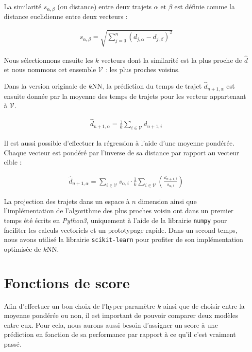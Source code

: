 \documentclass[letterpaper]{article}
\begin{document}
La similarité $s_{\alpha,\beta}$ (ou distance) entre deux trajets $\alpha$ et $\beta$ est définie comme la distance euclidienne entre deux vecteurs :

\begin{eqnarray}
s_{\alpha,\beta} = \sqrt{\sum_{j=0}^{n}(d_{j,\alpha} - d_{j,\beta})^2}
\end{eqnarray}

Nous sélectionnons ensuite les $k$ vecteurs dont la similarité est la plus proche de $\hat{d}$ et nous nommons cet ensemble $\mathcal{V}$ : les plus proches voisins.

Dans la version originale de $k$NN, la prédiction du temps de trajet $\hat{d}_{n+1,\alpha}$ est ensuite donnée par la moyenne des temps de trajets pour les vecteur appartenant à $\mathcal{V}$.

\begin{eqnarray}
\hat{d}_{n+1,\alpha} = \frac{1}{k} \sum_{i \in \mathcal{V}}d_{n+1,i}
\end{eqnarray}

Il est aussi possible d'effectuer la régression à l'aide d'une moyenne pondérée. Chaque vecteur est pondéré par l'inverse de sa distance par rapport au vecteur cible :

\begin{eqnarray}
\hat{d}_{n+1,\alpha} = \sum_{i \in \mathcal{V}} s_{\alpha, i} \cdot \frac{1}{k} \sum_{i \in \mathcal{V}}( \frac{d_{n+1,i}}{s_{\alpha, i}})
\end{eqnarray}

La projection des trajets dans un espace à $n$ dimension ainsi que l'implémentation de l'algorithme des plus proches voisin ont dans un premier temps été écrits en \textit{Python3}, uniquement à l'aide de la librairie \texttt{numpy} pour faciliter les calculs vectoriels et un prototypage rapide. Dans un second temps, nous avons utilisé la librairie \texttt{scikit-learn} pour profiter de son implémentation optimisée de $k$NN.

\section{Fonctions de score}

Afin d'effectuer un bon choix de l'hyper-paramètre $k$ ainsi que de choisir entre la moyenne pondérée ou non, il est important de pouvoir comparer deux modèles entre eux. Pour cela, nous aurons aussi besoin d'assigner un score à une prédiction en fonction de sa performance par rapport à ce qu'il c'est vraiment passé.
\end{document}
